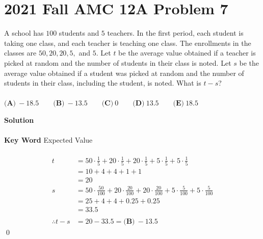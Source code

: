 \documentclass{article}
\newenvironment{solution}{\begin{trivlist}\item[]{\bf Solution}}{\qed \end{trivlist}}
\begin{document}
\section*{2021 Fall AMC 12A Problem 7}
A school has $100$ students and $5$ teachers. In the first period, each student is taking one class, and each teacher is teaching one class. The enrollments in the classes are $50, 20, 20, 5,$ and $5$. Let $t$ be the average value obtained if a teacher is picked at random and the number of students in their class is noted. Let $s$ be the average value obtained if a student was picked at random and the number of students in their class, including the student, is noted. What is $t-s$?
\\\\
$\textbf{(A)}\ {-}18.5  \qquad \textbf{(B)}\ {-}13.5 \qquad \textbf{(C)}\ 0 \qquad \textbf{(D)}\ 13.5 \qquad \textbf{(E)}\ 18.5$
\begin{solution}
\\\\
\textbf{Key Word} Expected Value
\\\\
\begin{align*}
    t
    &= 50\cdot\frac{1}{5} + 20\cdot\frac{1}{5} + 20\cdot\frac{1}{5} + 5\cdot\frac{1}{5} + 5\cdot\frac{1}{5} \\
    &= 10 + 4 + 4 + 1 + 1 \\
    &= 20 \\
    s
    &= 50\cdot\frac{50}{100} + 20\cdot\frac{20}{100} + 20\cdot\frac{20}{100} + 5\cdot\frac{5}{100} + 5\cdot\frac{5}{100} \\
    &= 25 + 4 + 4 + 0.25 + 0.25 \\
    &= 33.5
    \\\\
    \therefore t - s &= 20 - 33.5 = \boxed{\textbf{(B)}\ {-}13.5}
\end{align*}
\end{solution}

\newpage
\end{document}
